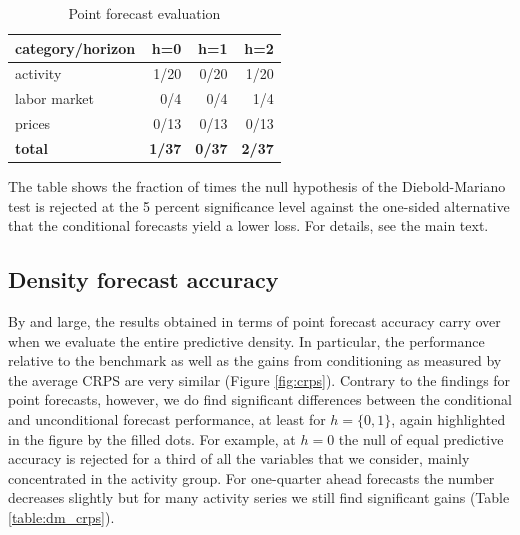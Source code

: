 \documentclass[notitlepage,a4paper,12pt]{article}
\begin{document}
\begin{table}[htb!]
    \centering
    \begin{threeparttable}
        \caption{Point forecast evaluation}
        \label{table:dm_rsmfe}
        \begin{tabular}{lrrr}
        \toprule
        category/horizon & h=0 & h=1 & h=2 \\ 
        \midrule
        activity &  1/20 & 0/20 & 1/20  \\ 
        labor market & 0/4 & 0/4 & 1/4  \\ 
        prices &0/13 & 0/13 & 0/13 \\ 
        \textbf{total} & \textbf{1/37} & \textbf{0/37} & \textbf{2/37} \\
        \bottomrule
        \end{tabular}
        \begin{tablenotes}
            \scriptsize
            \item The table shows the fraction of times the null hypothesis of the Diebold-Mariano test is rejected at the 5 percent significance level against the one-sided alternative that the conditional forecasts yield a lower loss. For details, see the main text.
        \end{tablenotes}
    \end{threeparttable}
\end{table}

\subsection{Density forecast accuracy}

By and large, the results obtained in terms of point forecast accuracy carry over when we evaluate the entire predictive density. In particular, the performance relative to the benchmark as well as the gains from conditioning as measured by the average CRPS are very similar (Figure \ref{fig:crps}). Contrary to the findings for point forecasts, however, we do find significant differences between the conditional and unconditional forecast performance, at least for $h=\{0, 1\}$, again highlighted in the figure by the filled dots. For example, at $h=0$ the null of equal predictive accuracy is rejected for a third of all the variables that we consider, mainly concentrated in the activity group. For one-quarter ahead forecasts the number decreases slightly but for many activity series we still find significant gains (Table \ref{table:dm_crps}). 
\end{document}
